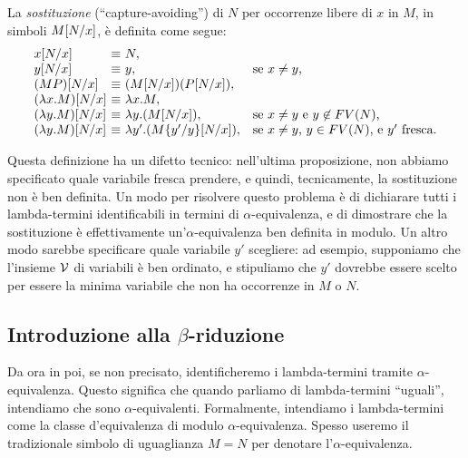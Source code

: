 \documentclass{article}
\begin{document}
\begin{definition}
  La {\em sostituzione} (``capture-avoiding'')  di $N$ per occorrenze
  libere di $x$ in $M$, in simboli $M[N/x]$, \`e definita
  come segue:
  \[  \begin{array}{l@{~}l@{~}ll}
    \subst{x}{N}{x} &\equiv & N, \\
    \subst{y}{N}{x} &\equiv & y, &\mbox{se $x\neq y$,} \\
    \subst{(MP)}{N}{x} &\equiv & (\subst{M}{N}{x})(\subst{P}{N}{x}), \\
    \subst{(\lam x.M)}{N}{x} &\equiv & \lam x.M, \\
    \subst{(\lam y.M)}{N}{x} &\equiv & \lam y.(\subst{M}{N}{x}), 
    &\mbox{se $x\neq y$ e $y\not\in\FV{N}$,} \\
    \subst{(\lam y.M)}{N}{x} &\equiv & \lam y'.(\subst{\ren{M}{y'}{y}}{N}{x}), 
    &\mbox{se $x\neq y$, $y\in\FV{N}$, e $y'$ fresca.} \\
  \end{array}
  \]
\end{definition}

Questa definizione ha un difetto tecnico: nell'ultima proposizione, non
abbiamo specificato quale variabile fresca prendere, e quindi, tecnicamente,
la sostituzione non \`e ben definita. Un modo per risolvere questo problema
\`e di dichiarare tutti i lambda-termini identificabili in termini di
$\alpha$-equivalenza, e di dimostrare che la sostituzione \`e effettivamente
un'$\alpha$-equivalenza ben definita in modulo. Un altro modo sarebbe
specificare quale variabile $y'$ scegliere: ad esempio, supponiamo che
l'insieme ${\cal V}$ di variabili \`e ben ordinato, e stipuliamo che $y'$ dovrebbe
essere scelto per essere la minima variabile che non ha occorrenze in $M$ o $N$.

\subsection{Introduzione alla $\beta$-riduzione}

\begin{convention}
Da ora in poi, se non precisato, identificheremo i lambda-termini tramite
$\alpha$-equivalenza. Questo significa che quando parliamo di lambda-termini
``uguali'', intendiamo che sono $\alpha$-equivalenti. Formalmente, intendiamo
i lambda-termini come la classe d'equivalenza di modulo $\alpha$-equivalenza.
Spesso useremo il tradizionale simbolo di uguaglianza $M=N$ per denotare
l'$\alpha$-equivalenza.
\end{convention}
\end{document}
